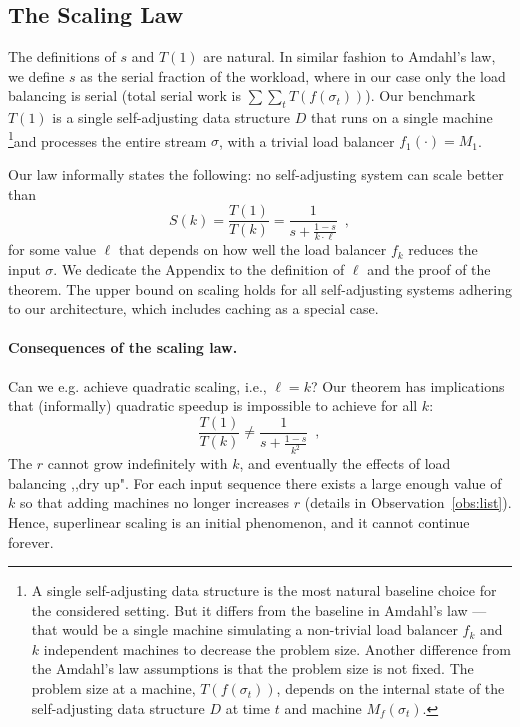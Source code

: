 \subsection{The Scaling Law}

The definitions of $s$ and $T(1)$ are natural.
In similar fashion to Amdahl's law, we define $s$ as the serial fraction of the workload, where in our case only the load balancing is serial (total serial work is $\sum \sum_t T(f(\sigma_t))$).
Our benchmark $T(1)$ is a single self-adjusting data structure $D$ that runs on a single machine \footnote{A single self-adjusting data structure is the most natural baseline choice for the considered setting. But it differs from the baseline in Amdahl's law --- that would be a single machine simulating a non-trivial load balancer $f_k$ and $k$ independent machines to decrease the problem size. Another difference from the Amdahl's law assumptions is that the problem size is not fixed. The problem size at a machine, $T(f(\sigma_t))$, depends on the internal state of the self-adjusting data structure $D$ at time $t$ and machine $M_f(\sigma_t)$.}and processes the entire stream $\sigma$, with a trivial load balancer $f_1(\cdot) = M_1$.


Our law informally states the following: no self-adjusting system can scale better than
\begin{equation}\label{eq:mtf-perf}
  S(k) = \frac{T(1)}{T(k)} = \frac1{s + \frac{1-s}{k \cdot \ell}} \enspace ,
\end{equation}
for some value $\ell$ that depends on how well the load balancer $f_k$ reduces the input $\sigma$.
We dedicate the Appendix to the definition of $\ell$ and the proof of the theorem.
The upper bound on scaling holds for all self-adjusting systems adhering to our architecture, which includes caching as a special case.




\paragraph{Consequences of the scaling law.}
Can we e.g. achieve quadratic scaling, i.e., $\ell = k$? 
Our theorem has implications that (informally) quadratic speedup is impossible to achieve for all $k$:
\begin{equation}\label{eq:mtf-perf}
  \frac{T(1)}{T(k)} \neq \frac1{s + \frac{1-s}{k^2}} \enspace ,
\end{equation}
The $r$ cannot grow indefinitely with $k$, and eventually the effects of load balancing ,,dry up". For each input sequence there exists a large enough value of $k$ so that adding machines no longer increases $r$ (details in Observation~\ref{obs:list}). Hence, superlinear scaling is an initial phenomenon, and it cannot continue forever.


